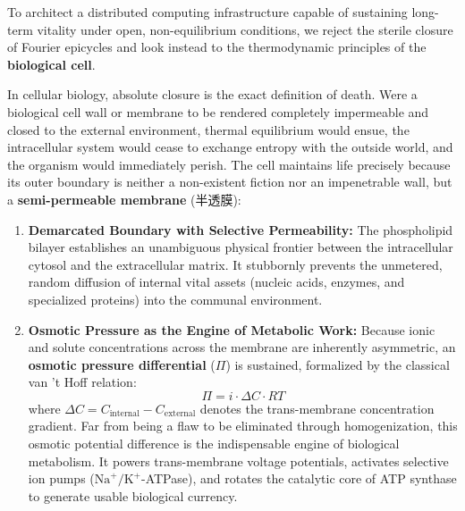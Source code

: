 \documentclass[11pt,a4paper]{article}
\begin{document}
To architect a distributed computing infrastructure capable of sustaining long-term vitality under open, non-equilibrium conditions, we reject the sterile closure of Fourier epicycles and look instead to the thermodynamic principles of the \textbf{biological cell}.

In cellular biology, absolute closure is the exact definition of death. Were a biological cell wall or membrane to be rendered completely impermeable and closed to the external environment, thermal equilibrium would ensue, the intracellular system would cease to exchange entropy with the outside world, and the organism would immediately perish. The cell maintains life precisely because its outer boundary is neither a non-existent fiction nor an impenetrable wall, but a \textbf{semi-permeable membrane} (半透膜):
\begin{enumerate}
    \item \textbf{Demarcated Boundary with Selective Permeability:} The phospholipid bilayer establishes an unambiguous physical frontier between the intracellular cytosol and the extracellular matrix. It stubbornly prevents the unmetered, random diffusion of internal vital assets (nucleic acids, enzymes, and specialized proteins) into the communal environment.
    \item \textbf{Osmotic Pressure as the Engine of Metabolic Work:} Because ionic and solute concentrations across the membrane are inherently asymmetric, an \textbf{osmotic pressure differential} ($\Pi$) is sustained, formalized by the classical van 't Hoff relation:
    \begin{equation}
    \Pi = i \cdot \Delta C \cdot R T
    \end{equation}
    where $\Delta C = C_{\text{internal}} - C_{\text{external}}$ denotes the trans-membrane concentration gradient. Far from being a flaw to be eliminated through homogenization, this osmotic potential difference is the indispensable engine of biological metabolism. It powers trans-membrane voltage potentials, activates selective ion pumps ($\text{Na}^+/\text{K}^+$-ATPase), and rotates the catalytic core of ATP synthase to generate usable biological currency.
\end{enumerate}
\end{document}
